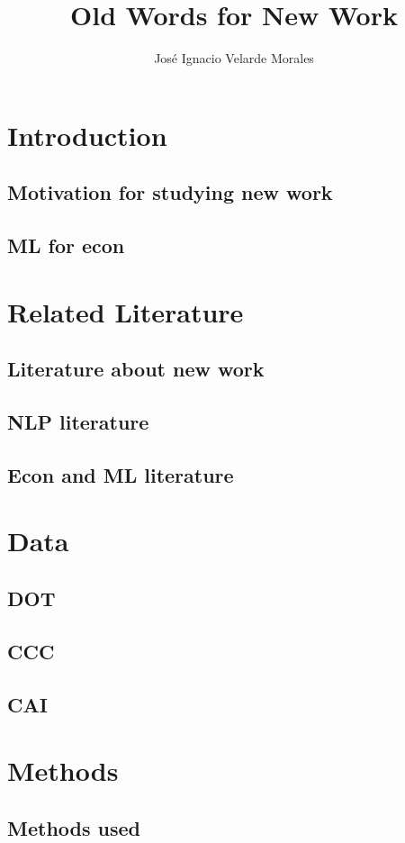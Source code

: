 \documentclass[11pt]{article}
\title{Old Words for New Work}
\author{José Ignacio Velarde Morales}
\begin{document}
\maketitle
\tableofcontents

\section{Introduction}
  \subsection{Motivation for studying new work}
  \subsection{ML for econ}

\section{Related Literature}
  \subsection{Literature about new work}
  \subsection{NLP literature}
  \subsection{Econ and ML literature}

\section{Data}
  \subsection{DOT}
  \subsection{CCC}
  \subsection{CAI}

\section{Methods}
  \subsection{Methods used}
\end{document}
